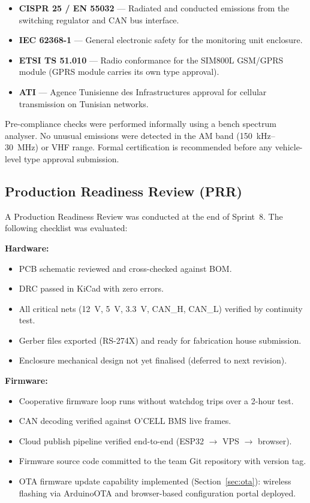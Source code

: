 \begin{itemize}
    \item \textbf{CISPR 25 / EN 55032} --- Radiated and conducted emissions from the switching regulator and CAN bus interface.
    \item \textbf{IEC 62368-1} --- General electronic safety for the monitoring unit enclosure.
    \item \textbf{ETSI TS 51.010} --- Radio conformance for the SIM800L GSM/GPRS module (GPRS module carries its own type approval).
    \item \textbf{ATI} --- Agence Tunisienne des Infrastructures approval for cellular transmission on Tunisian networks.
\end{itemize}

Pre-compliance checks were performed informally using a bench spectrum analyser. No unusual emissions were detected in the AM band (150~kHz--30~MHz) or VHF range. Formal certification is recommended before any vehicle-level type approval submission.

\subsection{Production Readiness Review (PRR)}

A Production Readiness Review was conducted at the end of Sprint~8. The following checklist was evaluated:

\textbf{Hardware:}
\begin{itemize}
    \item[$\checkmark$] PCB schematic reviewed and cross-checked against BOM.
    \item[$\checkmark$] DRC passed in KiCad with zero errors.
    \item[$\checkmark$] All critical nets (12~V, 5~V, 3.3~V, CAN\_H, CAN\_L) verified by continuity test.
    \item[$\checkmark$] Gerber files exported (RS-274X) and ready for fabrication house submission.
    \item[$\times$] Enclosure mechanical design not yet finalised (deferred to next revision).
\end{itemize}

\textbf{Firmware:}
\begin{itemize}
    \item[$\checkmark$] Cooperative firmware loop runs without watchdog trips over a 2-hour test.
    \item[$\checkmark$] CAN decoding verified against O'CELL BMS live frames.
    \item[$\checkmark$] Cloud publish pipeline verified end-to-end (ESP32 $\rightarrow$ VPS $\rightarrow$ browser).
    \item[$\checkmark$] Firmware source code committed to the team Git repository with version tag.
    \item[$\checkmark$] OTA firmware update capability implemented (Section~\ref{sec:ota}): wireless flashing via ArduinoOTA and browser-based configuration portal deployed.
\end{itemize}

